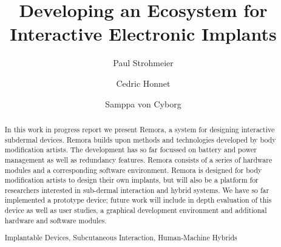 \documentclass[runningheads,a4paper]{llncs}
\newcommand{\keywords}[1]{\par\addvspace\baselineskip
\noindent\keywordname\enspace\ignorespaces#1}
\begin{document}
\mainmatter  %

\title{Developing an Ecosystem for Interactive
Electronic Implants}


%
%
\author{Paul Strohmeier
\and Cedric Honnet
\and Samppa von Cyborg}
%


%

\maketitle


\begin{abstract}

In this work in progress report we present Remora, a system for designing interactive subdermal devices. Remora builds upon methods and technologies developed by body modification artists. The development has so far focussed on battery and power management as well as redundancy features. Remora consists of a series of hardware modules and a corresponding software environment. Remora is designed for body modification artists to design their own implants, but will also be a platform for researchers interested in sub-dermal interaction and hybrid systems. We have so far implemented a prototype device; future work will include in depth evaluation of this device as well as user studies, a graphical development environment and additional hardware and software modules.

\keywords{Implantable Devices, Subcutaneous Interaction, Human-Machine Hybrids}
\end{abstract}
\end{document}
